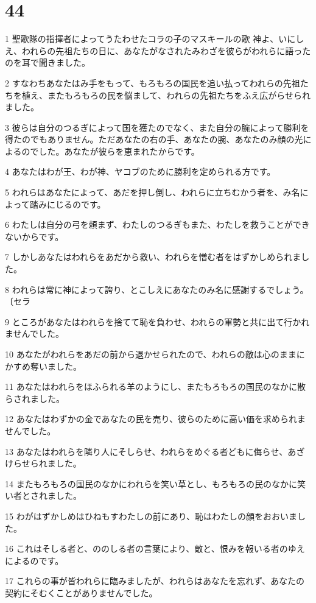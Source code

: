 \chapter{44}

\par 1 聖歌隊の指揮者によってうたわせたコラの子のマスキールの歌 神よ、いにしえ、われらの先祖たちの日に、あなたがなされたみわざを彼らがわれらに語ったのを耳で聞きました。
\par 2 すなわちあなたはみ手をもって、もろもろの国民を追い払ってわれらの先祖たちを植え、またもろもろの民を悩まして、われらの先祖たちをふえ広がらせられました。
\par 3 彼らは自分のつるぎによって国を獲たのでなく、また自分の腕によって勝利を得たのでもありません。ただあなたの右の手、あなたの腕、あなたのみ顔の光によるのでした。あなたが彼らを恵まれたからです。
\par 4 あなたはわが王、わが神、ヤコブのために勝利を定められる方です。
\par 5 われらはあなたによって、あだを押し倒し、われらに立ちむかう者を、み名によって踏みにじるのです。
\par 6 わたしは自分の弓を頼まず、わたしのつるぎもまた、わたしを救うことができないからです。
\par 7 しかしあなたはわれらをあだから救い、われらを憎む者をはずかしめられました。
\par 8 われらは常に神によって誇り、とこしえにあなたのみ名に感謝するでしょう。〔セラ
\par 9 ところがあなたはわれらを捨てて恥を負わせ、われらの軍勢と共に出て行かれませんでした。
\par 10 あなたがわれらをあだの前から退かせられたので、われらの敵は心のままにかすめ奪いました。
\par 11 あなたはわれらをほふられる羊のようにし、またもろもろの国民のなかに散らされました。
\par 12 あなたはわずかの金であなたの民を売り、彼らのために高い価を求められませんでした。
\par 13 あなたはわれらを隣り人にそしらせ、われらをめぐる者どもに侮らせ、あざけらせられました。
\par 14 またもろもろの国民のなかにわれらを笑い草とし、もろもろの民のなかに笑い者とされました。
\par 15 わがはずかしめはひねもすわたしの前にあり、恥はわたしの顔をおおいました。
\par 16 これはそしる者と、ののしる者の言葉により、敵と、恨みを報いる者のゆえによるのです。
\par 17 これらの事が皆われらに臨みましたが、われらはあなたを忘れず、あなたの契約にそむくことがありませんでした。
